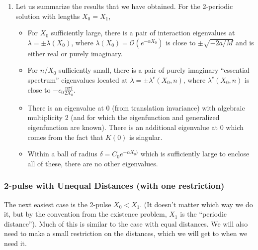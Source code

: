 \documentclass[12pt]{article}
\begin{document}
\begin{enumerate}
\item Let us summarize the results that we have obtained. For the 2-periodic solution with lengths $X_0 = X_1$,

\begin{itemize}
	\item For $X_0$ sufficiently large, there is a pair of interaction eigenvalues at $\lambda = \pm \lambda(X_0)$, where $\lambda(X_0) = \mathcal{O}(e^{-\alpha X_0})$ is close to $\pm \sqrt{-2a/M}$ and is either real or purely imaginary.
	\item For $n/X_0$ sufficiently small, there is a pair of purely imaginary ``essential spectrum'' eigenvalues located at $\lambda = \pm \lambda^c(X_0, n)$, where $\lambda^c(X_0, n)$ is close to $-c_0 \frac{n \pi i }{2 X_0}$.
	\item There is an eigenvalue at 0 (from translation invariance) with algebraic multiplicity 2 (and for which the eigenfunction and generalized eigenfunction are known). There is an additional eigenvalue at 0 which comes from the fact that $K(0)$ is singular.
	\item Within a ball of radius $\delta = C_0 e^{-\alpha X_0)}$ which is sufficiently large to enclose all of these, there are no other eigenvalues.
\end{itemize}

\end{enumerate}

\subsubsection{2-pulse with Unequal Distances (with one restriction)}

The next easiest case is the 2-pulse $X_0 < X_1$. (It doesn't matter which way we do it, but by the convention from the existence problem, $X_1$ is the ``periodic distance''). Much of this is similar to the case with equal distances. We will also need to make a small restriction on the distances, which we will get to when we need it.
\end{document}
